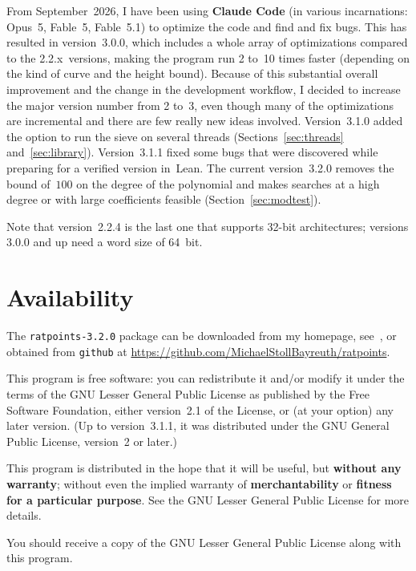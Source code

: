 \documentclass[12pt,a4paper,oneside]{amsart}
\newcommand{\rpversion}{3.2.0} %
\begin{document}
From September~2026, I have been using \textbf{Claude Code} (in various
incarnations: Opus~5, Fable~5, Fable~5.1) to optimize the code and find and fix
bugs. This has resulted in version~3.0.0, which includes
a whole array of optimizations compared to the 2.2.x~versions, making
the program run 2 to~10 times faster (depending on the kind
of curve and the height bound). Because of this substantial overall
improvement and the change in the development workflow, I decided to
increase the major version number from 2 to~3, even though many of
the optimizations are incremental and there are few really new ideas involved.
Version~3.1.0 added the option to run the sieve on several
threads (Sections~\ref{sec:threads} and~\ref{sec:library}).
Version~3.1.1 fixed some bugs that were discovered while preparing
for a verified version in~Lean.
The current version~3.2.0 removes the bound of~$100$ on the degree of the
polynomial and makes searches at a high degree or with large coefficients
feasible (Section~\ref{sec:modtest}).

Note that version~2.2.4 is the last one that supports 32-bit architectures;
versions 3.0.0 and up need a word size of 64~bit.


\section{Availability}

The \texttt{ratpoints-\rpversion} package can be downloaded from my homepage,
see~\cite{ratpoints}, or obtained from \texttt{github} at
\url{https://github.com/MichaelStollBayreuth/ratpoints}.

This program is free software: you can redistribute it and/or modify
it under the terms of the GNU Lesser General Public License as published
by the Free Software Foundation, either version~2.1 of the License, or
(at your option) any later version. (Up to version~3.1.1, it was
distributed under the GNU General Public License, version~2 or later.)

This program is distributed in the hope that it will be useful,
but \textbf{without any warranty}; without even the implied warranty of
\textbf{merchantability} or \textbf{fitness for a particular purpose}. See the
GNU Lesser General Public License for more details.

You should receive a copy of the GNU Lesser General Public License
along with this program.
\end{document}
